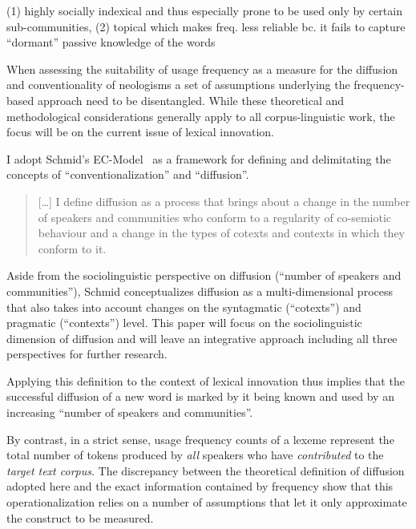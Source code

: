 \documentclass[
  a4paper,
  abstract=on,
  captions=tableabove
  ]{scrartcl}
\begin{document}
    (1) highly socially indexical and thus especially prone to be used only by certain sub-communities,
    (2) topical which makes freq. less reliable bc. it fails to capture \enquote{dormant} passive knowledge of the words

    When assessing the suitability of usage frequency as a measure for the diffusion and conventionality of neologisms a set of assumptions underlying the frequency-based approach need to be disentangled. While these theoretical and methodological considerations generally apply to all corpus-linguistic work, the focus will be on the current issue of lexical innovation.

    I adopt Schmid's EC-Model~\parencite{Schmid2020DynamicsLinguistic} as a framework for defining and delimitating the concepts of \enquote{conventionalization} and \enquote{diffusion}.

    \begin{quote}
    [\dots] I define diffusion as a process that brings about a change in the number of speakers and communities who conform to a regularity of co-semiotic behaviour and a change in the types of cotexts and contexts in which they conform to it.
    \end{quote}

    Aside from the sociolinguistic perspective on diffusion (\enquote{number of speakers and communities}), Schmid conceptualizes diffusion as a multi-dimensional process that also takes into account changes on the syntagmatic (\enquote{cotexts}) and pragmatic (\enquote{contexts}) level. This paper will focus on the sociolinguistic dimension of diffusion and will leave an integrative approach including all three perspectives for further research.

    Applying this definition to the context of lexical innovation thus implies that the successful diffusion of a new word is marked by it being known and used by an increasing \enquote{number of speakers and communities}.

    By contrast, in a strict sense, usage frequency counts of a lexeme represent the total number of tokens produced by \emph{all} speakers who have \emph{contributed} to the \emph{target text corpus}. The discrepancy between the theoretical definition of diffusion adopted here and the exact information contained by frequency show that this operationalization relies on a number of assumptions that let it only approximate the construct to be measured.
\end{document}
